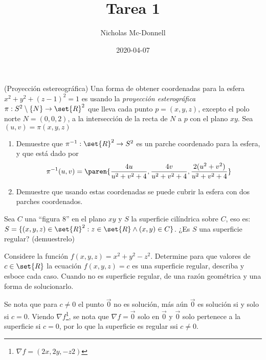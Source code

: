 \documentclass{homework}
\title{Tarea 1}
\date{2020-04-07}
\author{Nicholas Mc-Donnell}
\begin{document}
\maketitle
\newpage
{}


\begin{prob}
    (Proyección estereográfica) Una forma de obtener coordenadas para la esfera \(x^2+y^2+(z-1)^2=1\) es usando la \textit{proyección esterográfica} \(\pi:S^2\setminus\{N\}\rightarrow\set{R}^2\) que lleva cada punto \(p=(x,y,z)\), excepto el polo norte \(N=(0,0,2)\), a la intersección de la recta de \(N\) a \(p\) con el plano \(xy\). Sea \((u,v)=\pi(x,y,z)\)
    \begin{enumerate}
        \item Demuestre que \(\pi^{-1}:\set{R}^2\rightarrow S^2\) es un parche coordenado para la esfera, y que está dado por
        \begin{equation*}
            \pi^{-1}(u,v)=\paren{\frac{4u}{u^2+v^2+4}, \frac{4v}{u^2+v^2+4}, \frac{2(u^2+v^2)}{u^2+v^2+4}}
        \end{equation*}
        \item Demuestre que usando estas coordenadas se puede cubrir la esfera con dos parches coordenados.
    \end{enumerate}
\end{prob}

\begin{sol}

\end{sol}


\begin{prob}
    Sea \(C\) una ``figura 8'' en el plano \(xy\) y \(S\) la superficie cilíndrica sobre \(C\), eso es: \(S=\{(x,y,z)\in\set{R}^2:z\in\set{R}\wedge (x,y)\in C\}\). ¿Es \(S\) una superficie regular? (demuestrelo)
\end{prob}

\begin{sol}

\end{sol}


\begin{prob}
    Considere la función \(f(x,y,z)=x^2+y^2-z^2\). Determine para que valores de \(c\in\set{R}\) la ecuación \(f(x,y,z)=c\) es una superficie regular, describa y esboce cada caso. Cuando no es superficie regular, de una razón geométrica y una forma de solucionarlo.
\end{prob}

\begin{sol}
    Se nota que para \(c\neq0\) el punto \(\vec{0}\) no es solución, más aún \(\vec{0}\) es solución si y solo si \(c=0\). Viendo \(\nabla f\)\footnote{\(\nabla f=(2x,2y,-z2)\)}, se nota que \(\nabla f=\vec{0}\) solo en \(\vec{0}\) y \(\vec{0}\) solo pertenece a la superficie si \(c=0\), por lo que la superficie es regular ssi \(c\neq0\).
\end{sol}
\end{document}
